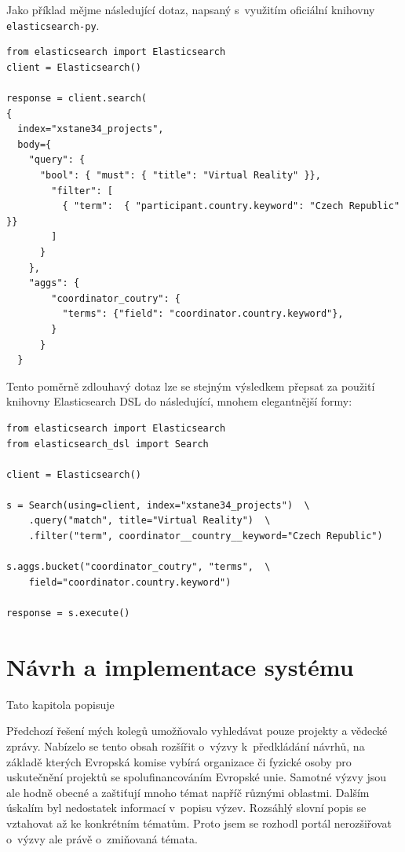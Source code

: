 Jako příklad mějme následující dotaz, napsaný s~využitím oficiální knihovny \texttt{elasticsearch-py}.
\begin{verbatim}
from elasticsearch import Elasticsearch
client = Elasticsearch()

response = client.search(
{
  index="xstane34_projects",
  body={
    "query": { 
      "bool": { "must": { "title": "Virtual Reality" }}, 
        "filter": [ 
          { "term":  { "participant.country.keyword": "Czech Republic" }}
        ]
      }
    },
    "aggs": {
        "coordinator_coutry": {
          "terms": {"field": "coordinator.country.keyword"},
        }
      }
  }
\end{verbatim}

Tento poměrně zdlouhavý dotaz lze se stejným výsledkem přepsat za použití knihovny Elasticsearch DSL do následující, mnohem elegantnější formy:

\begin{verbatim}
from elasticsearch import Elasticsearch
from elasticsearch_dsl import Search

client = Elasticsearch()

s = Search(using=client, index="xstane34_projects")  \
    .query("match", title="Virtual Reality")  \
    .filter("term", coordinator__country__keyword="Czech Republic")

s.aggs.bucket("coordinator_coutry", "terms",  \
    field="coordinator.country.keyword")

response = s.execute()
\end{verbatim}

\blindtext[2]





\chapter{Návrh a implementace systému}
Tato kapitola popisuje \blindtext

Předchozí řešení mých kolegů umožňovalo vyhledávat pouze projekty a vědecké zprávy. Nabízelo se tento obsah rozšířit o~výzvy k~předkládání návrhů, na základě kterých Evropská komise vybírá organizace či fyzické osoby pro uskutečnění projektů se spolufinancováním Evropské unie.
Samotné výzvy jsou ale hodně obecné a zaštiťují mnoho témat napříč různými oblastmi. Dalším úskalím byl nedostatek informací v~popisu výzev. Rozsáhlý slovní popis se vztahovat až ke konkrétním tématům. Proto jsem se rozhodl portál nerozšiřovat o~výzvy ale právě o~zmiňovaná témata.

